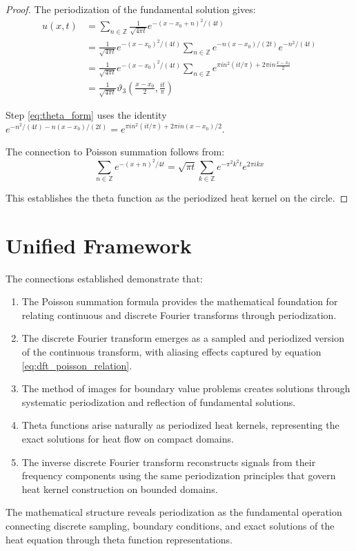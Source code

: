 \documentclass{article}
\begin{document}
\begin{proof}
The periodization of the fundamental solution gives:
\begin{align}
u(x,t) &= \sum_{n \in \mathbb{Z}} \frac{1}{\sqrt{4\pi t}} e^{-(x-x_0+n)^2/(4t)} \label{eq:periodized_kernel}\\
&= \frac{1}{\sqrt{4\pi t}} e^{-(x-x_0)^2/(4t)} \sum_{n \in \mathbb{Z}} e^{-n(x-x_0)/(2t)} e^{-n^2/(4t)} \label{eq:factored}\\
&= \frac{1}{\sqrt{4\pi t}} e^{-(x-x_0)^2/(4t)} \sum_{n \in \mathbb{Z}} e^{\pi i n^2 (it/\pi) + 2\pi i n \frac{x-x_0}{2}} \label{eq:theta_form}\\
&= \frac{1}{\sqrt{4\pi t}} \vartheta_3\left(\frac{x-x_0}{2}, \frac{it}{\pi}\right) \label{eq:theta_identified}
\end{align}

Step \eqref{eq:theta_form} uses the identity $e^{-n^2/(4t) - n(x-x_0)/(2t)} = e^{\pi i n^2 (it/\pi) + 2\pi i n (x-x_0)/2}$.

The connection to Poisson summation follows from:
\begin{equation}
\label{eq:poisson_theta}
\sum_{n \in \mathbb{Z}} e^{-(x+n)^2/4t} = \sqrt{\pi t} \sum_{k \in \mathbb{Z}} e^{-\pi^2 k^2 t} e^{2\pi i k x}
\end{equation}

This establishes the theta function as the periodized heat kernel on the circle.
\end{proof}

\section{Unified Framework}

The connections established demonstrate that:

\begin{enumerate}
\item The Poisson summation formula provides the mathematical foundation for relating continuous and discrete Fourier transforms through periodization.

\item The discrete Fourier transform emerges as a sampled and periodized version of the continuous transform, with aliasing effects captured by equation \eqref{eq:dft_poisson_relation}.

\item The method of images for boundary value problems creates solutions through systematic periodization and reflection of fundamental solutions.

\item Theta functions arise naturally as periodized heat kernels, representing the exact solutions for heat flow on compact domains.

\item The inverse discrete Fourier transform reconstructs signals from their frequency components using the same periodization principles that govern heat kernel construction on bounded domains.
\end{enumerate}

The mathematical structure reveals periodization as the fundamental operation connecting discrete sampling, boundary conditions, and exact solutions of the heat equation through theta function representations.
\end{document}
